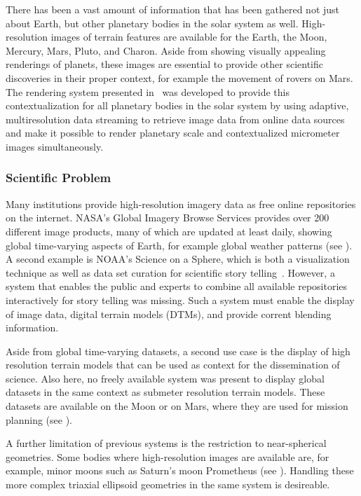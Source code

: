 There has been a vast amount of information that has been gathered not just about Earth, but other planetary bodies in the solar system as well.  High-resolution images of terrain features are available for the Earth, the Moon, Mercury, Mars, Pluto, and Charon.  Aside from showing visually appealing renderings of planets, these images are essential to provide other scientific discoveries in their proper context, for example the movement of rovers on Mars.  The rendering system presented in \paperGB\ was developed to provide this contextualization for all planetary bodies in the solar system by using adaptive, multiresolution data streaming to retrieve image data from online data sources and make it possible to render planetary scale and contextualized micrometer images simultaneously.


\subsubsection{Scientific Problem} \label{contributions:astro:gb:problem}
Many institutions provide high-resolution imagery data as free online repositories on the internet.  NASA's Global Imagery Browse Services provides over 200 different image products, many of which are updated at least daily, showing global time-varying aspects of Earth, for example global weather patterns (see ).  A second example is NOAA's Science on a Sphere, which is both a visualization technique as well as data set curation for scientific story telling~\cite{ma2012scientific}.  However, a system that enables the public and experts to combine all available repositories interactively for story telling was missing.  Such a system must enable the display of image data, digital terrain models (DTMs), and provide corrent blending information.

Aside from global time-varying datasets, a second use case is the display of high resolution terrain models that can be used as context for the dissemination of science.  Also here, no freely available system was present to display global datasets in the same context as submeter resolution terrain models.  These datasets are available on the Moon or on Mars, where they are used for mission planning (see ).

A further limitation of previous systems is the restriction to near-spherical geometries.  Some bodies where high-resolution images are available are, for example, minor moons such as Saturn's moon Prometheus (see ).  Handling these more complex triaxial ellipsoid geometries in the same system is desireable.


